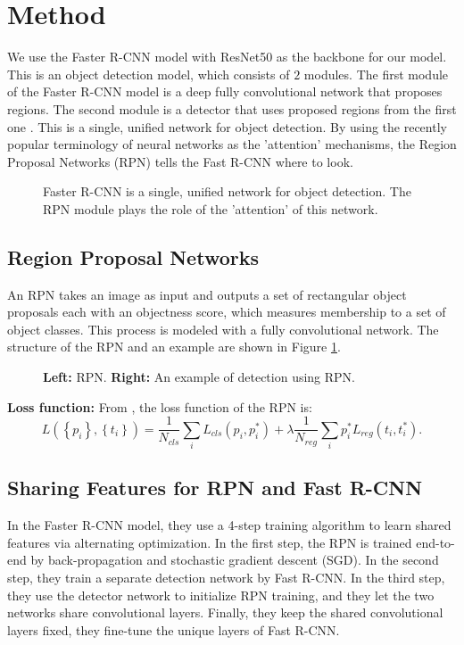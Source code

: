 \section{Method}
We use the Faster R-CNN model with ResNet50 as the backbone for our model. This is an object detection model, which consists of $2$ modules. The first module of the Faster R-CNN model is a deep fully convolutional network that proposes regions. The second module is a detector that uses proposed regions from the first one \cite{f-rcnn}. This is a single, unified network for object detection. By using the recently popular terminology of neural networks as the 'attention' mechanisms, the Region Proposal Networks (RPN) tells the Fast R-CNN where to look.

\begin{figure}[H]
\caption{Faster R-CNN is a single, unified network for object detection. The RPN module plays the role of the 'attention' of this network.}
\end{figure}

\subsection{Region Proposal Networks}
An RPN takes an image as input and outputs a set of rectangular object proposals each with an objectness score, which measures membership to a set of object classes. This process is modeled with a fully convolutional network. The structure of the RPN and an example are shown in Figure \ref{rpn}.

\begin{figure}[H]
\caption{\textbf{Left:} RPN. \textbf{Right:} An example of detection using RPN.}
\label{rpn}
\end{figure}

\textbf{Loss function:} From \cite{f-rcnn}, the loss function of the RPN is:
$$L\left( {\left\{ {{p_i}} \right\},\left\{ {{t_i}} \right\}} \right) = \frac{1}{{{N_{cls}}}}\sum\limits_i {{L_{cls}}\left( {{p_i},p_i^*} \right) + \lambda \frac{1}{{{N_{reg}}}}\sum\limits_i {p_i^*} } {L_{reg}}\left( {{t_i},t_i^*} \right).$$

\subsection{Sharing Features for RPN and Fast R-CNN}
In the Faster R-CNN model, they use a 4-step training algorithm to learn shared features via alternating optimization. In the first step, the RPN is trained end-to-end by back-propagation and stochastic gradient descent (SGD). In the second step, they train a separate detection network by Fast R-CNN. In the third step, they use the detector network to initialize RPN training, and they let the two networks share convolutional layers. Finally, they keep the shared convolutional layers fixed, they fine-tune the unique layers of Fast R-CNN.
